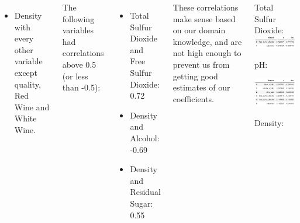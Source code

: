 \documentclass{beamer}
\begin{document}
\begin{frame}
\begin{footnotesize}
\begin{columns}
\begin{itemize}
			\item Density with every other variable except quality, Red Wine and White Wine.   
			\end{itemize}
			The following variables had correlations above 0.5 (or less than -0.5):  \par
			\begin{itemize}
			\item Total Sulfur Dioxide and Free Sulfur Dioxide:  0.72
			\item Density and Alcohol:  -0.69 
			\item Density and Residual Sugar:  0.55 
			\end{itemize}
		These correlations make sense based on our domain knowledge, and are not high enough to prevent us from getting good estimates of our coefficients.  
		\vspace{-5pt}
		\begin{center}
			Total Sulfur Dioxide:
					\includegraphics[height=.1\textheight]{images/SO2.png}  \par
					pH: \par
					\includegraphics[height=.23\textheight]{images/acidity.png}  \par
					Density: \par

\end{center}
\end{columns}
\end{footnotesize}
\end{frame}
\end{document}
